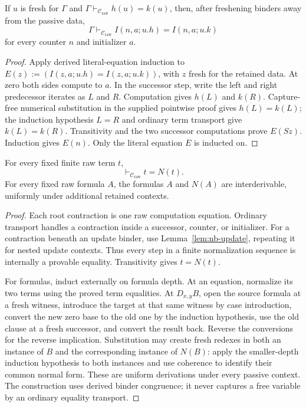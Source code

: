 \begin{lemma}
\label{lem:nb-update}
If $u$ is fresh for $\Gamma$ and
$\Gamma\vdash_{\mathcal C_{\mathrm{raw}}}h(u)=k(u)$, then, after
freshening binders away from the passive data,
\[
 \Gamma\vdash_{\mathcal C_{\mathrm{raw}}}
     I(n,a;u.h)=I(n,a;u.k)
\]
for every counter $n$ and initializer $a$.
\end{lemma}
\begin{proof}
Apply derived literal-equation induction to
$E(z):=(I(z,a;u.h)=I(z,a;u.k))$, with $z$ fresh for the retained data.
At zero both sides compute to $a$. In the successor step, write the
left and right predecessor iterates as $L$ and $R$. Computation gives
$h(L)$ and $k(R)$. Capture-free numerical substitution in the supplied
pointwise proof gives $h(L)=k(L)$; the induction hypothesis $L=R$
and ordinary term transport give $k(L)=k(R)$. Transitivity and the
two successor computations prove $E(Sz)$. Induction gives $E(n)$.
Only the literal equation $E$ is inducted on.
\end{proof}

\begin{lemma}
\label{lem:nb-internal}
For every fixed finite raw term $t$,
\[
              \vdash_{\mathcal C_{\mathrm{raw}}}t=N(t).
\]
For every fixed raw formula $A$, the formulas $A$ and $N(A)$ are
interderivable, uniformly under additional retained contexts.
\end{lemma}
\begin{proof}
Each root contraction is one raw computation equation. Ordinary
transport handles a contraction inside a successor, counter, or
initializer. For a contraction beneath an update binder, use
Lemma~\ref{lem:nb-update}, repeating it for nested update contexts.
Thus every step in a finite normalization sequence is internally a
provable equality. Transitivity gives $t=N(t)$.

For formulas, induct externally on formula depth. At an equation,
normalize its two terms using the proved term equalities. At
$D_{x,y}B$, open the source formula at a fresh witness, introduce the
target at that same witness by case introduction, convert the new
zero base to the old one by the induction hypothesis, use the old
clause at a fresh successor, and convert the result back. Reverse the
conversions for the reverse implication. Substitution may create fresh
redexes in both an instance of $B$ and the corresponding instance of
$N(B)$: apply the smaller-depth induction hypothesis to both instances
and use coherence to identify their common normal form. These are uniform
derivations under every passive context. The construction uses
derived binder congruence; it never captures a free variable by an
ordinary equality transport.
\end{proof}

